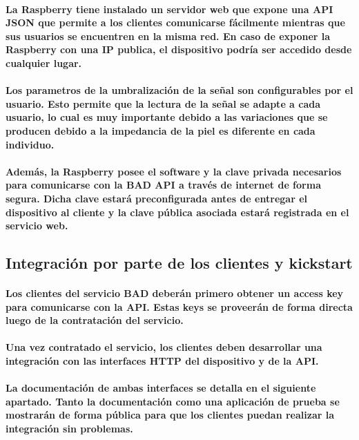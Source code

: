 \documentclass{article}
\begin{document}
\paragraph{
La Raspberry tiene instalado un servidor web que expone una API JSON que permite a los clientes comunicarse fácilmente mientras que sus usuarios se encuentren en la misma red. En caso de exponer la Raspberry con una IP publica, el dispositivo podría ser accedido desde cualquier lugar.
}
\paragraph{
Los parametros de la umbralización de la señal son configurables por el usuario. Esto permite que la lectura de la señal se adapte a cada usuario, lo cual es muy importante debido a las variaciones que se producen debido a la impedancia de la piel es diferente en cada individuo.
}
\paragraph{
Además, la Raspberry posee el software y la clave privada necesarios para comunicarse con la BAD API a través de internet de forma segura. Dicha clave estará preconfigurada antes de entregar el dispositivo al cliente y la clave pública asociada estará registrada en el servicio web.
}

\subsection{Integración por parte de los clientes y kickstart}
\paragraph{
Los clientes del servicio BAD deberán primero obtener un access key para comunicarse con la API. Estas keys se proveerán de forma directa luego de la contratación del servicio.
}
\paragraph{
Una vez contratado el servicio, los clientes deben desarrollar una integración con las interfaces HTTP del dispositivo y de la API.
}
\paragraph{
La documentación de ambas interfaces se detalla en el siguiente apartado. Tanto la documentación como una aplicación de prueba se mostrarán de forma pública para que los clientes puedan realizar la integración sin problemas.
}
\end{document}
